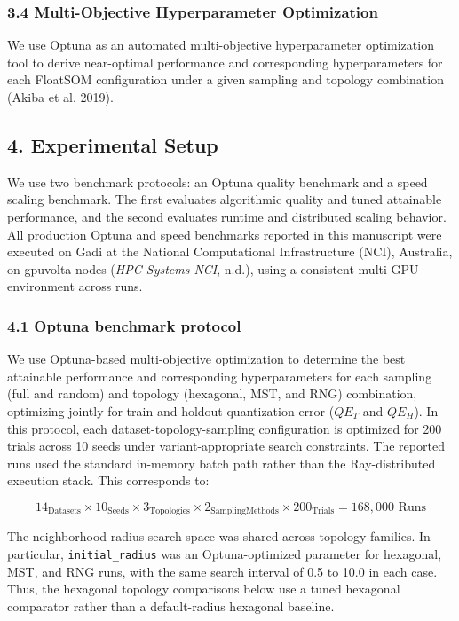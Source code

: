 \documentclass[
]{article}
\providecommand{\DIFadd}[1]{{\protect\color{blue} #1}} %
\providecommand{\DIFaddbegin}{} %
\begin{document}
\subsubsection{3.4 Multi-Objective Hyperparameter
Optimization}\label{multi-objective-hyperparameter-optimization}

We use Optuna as an automated multi-objective hyperparameter
optimization tool to derive near-optimal performance and corresponding
hyperparameters for each FloatSOM configuration under a given sampling
and topology combination (Akiba et al. 2019).

\subsection{4. Experimental Setup}\label{experimental-setup}

We use two benchmark protocols: an Optuna quality benchmark and a speed
scaling benchmark. The first evaluates algorithmic quality and tuned
attainable performance, and the second evaluates runtime and distributed
scaling behavior. All production Optuna and speed benchmarks reported in
this manuscript were executed on Gadi at the National Computational
Infrastructure (NCI), Australia, on gpuvolta nodes (\emph{{HPC Systems}
\textbar{} {NCI}}, n.d.), using a consistent multi-GPU environment
across runs.

\subsubsection{4.1 Optuna benchmark
protocol}\label{optuna-benchmark-protocol}

We use Optuna-based multi-objective optimization to determine the best
attainable performance and corresponding hyperparameters for each
sampling (full and random) and topology (hexagonal, MST, and RNG)
combination, optimizing jointly for train and holdout quantization error
(\(QE_T\) and \(QE_H\)). In this protocol, each
dataset-topology-sampling configuration is optimized for 200 trials
across 10 seeds under variant-appropriate search constraints. The
reported runs used the standard in-memory batch path rather than the
Ray-distributed execution stack. This corresponds to:

\[
14_{\text{Datasets}} \times 10_{\text{Seeds}} \times 3_{\text{Topologies}} \times 2_{\text{SamplingMethods}} \times 200_{\text{Trials}}= 168{,}000 \text{ Runs}
\]

 \DIFaddbegin \DIFadd{The neighborhood-radius search space was shared across topology
families. In particular, \texttt{initial\_radius} was an
Optuna-optimized parameter for hexagonal, MST, and RNG runs, with the
same search interval of 0.5 to 10.0 in each case. Thus, the hexagonal
topology comparisons below use a tuned hexagonal comparator rather than
a default-radius hexagonal baseline.
}
\end{document}
